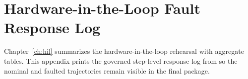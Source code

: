 \chapter{Hardware-in-the-Loop Fault Response Log}
\label{app:hil-fault-response-log}

Chapter~\ref{ch:hil} summarizes the hardware-in-the-loop rehearsal
with aggregate tables. This appendix prints the governed step-level response
log from  so the
nominal and faulted trajectories remain visible in the final package.


